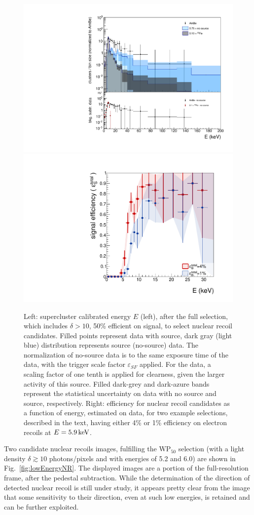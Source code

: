 \begin{figure}[ht]
  \begin{center}
    \includegraphics[width=0.45\linewidth]{figures/energyFull_WP50}
    \includegraphics[width=0.45\linewidth]{figures/energyFull_effi}

    \caption{Left: supercluster calibrated energy $E$ (left), after
      the full selection, which includes $\delta>10$, 50\% efficient
      on signal, to select nuclear recoil candidates. Filled points
      represent data with \ambe source, dark gray (light blue)
      distribution represents \fe source (no-source) data.  The
      normalization of no-source data is to the same exposure time of
      the \ambe data, with the trigger scale factor $\varepsilon_{SF}$
      applied. For the \fe data, a scaling factor of one tenth is
      applied for clearness, given the larger activity of this
      source. Filled dark-grey and dark-azure bands represent the
      statistical uncertainty on data with no source and \fe source,
      respectively. Right: efficiency for nuclear recoil candidates as
      a function of energy, estimated on \ambe data, for two example
      selections, described in the text, having either 4\% or 1\%
      efficiency on electron recoils at
      $E=5.9\,\textrm{ke\hspace{-.08em}V}$. \label{fig:fullsel_effi}}

  \end{center}
\end{figure}

Two candidate nuclear recoils images, fulfilling the
$\mathrm{WP}_{50}$ selection (with a light density $\delta\gtrsim10$
photons/pixels and with energies of 5.2 and 6.0\keV) are shown in
Fig.~\ref{fig:lowEnergyNR}. The displayed images are a portion of the
full-resolution frame, after the pedestal subtraction. While the
determination of the direction of detected nuclear recoil is still
under study, it appears pretty clear from the image that some
sensitivity to their direction, even at such low energies, is retained
and can be further exploited.

